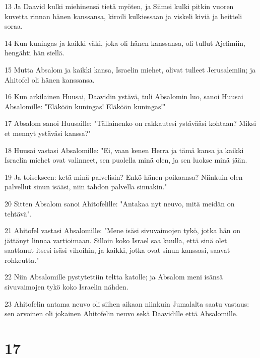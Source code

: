 \par 13 Ja Daavid kulki miehinensä tietä myöten, ja Siimei kulki pitkin vuoren kuvetta rinnan hänen kanssansa, kiroili kulkiessaan ja viskeli kiviä ja heitteli soraa.
\par 14 Kun kuningas ja kaikki väki, joka oli hänen kanssansa, oli tullut Ajefimiin, hengähti hän siellä.
\par 15 Mutta Absalom ja kaikki kansa, Israelin miehet, olivat tulleet Jerusalemiin; ja Ahitofel oli hänen kanssansa.
\par 16 Kun arkilainen Huusai, Daavidin ystävä, tuli Absalomin luo, sanoi Huusai Absalomille: "Eläköön kuningas! Eläköön kuningas!"
\par 17 Absalom sanoi Huusaille: "Tällainenko on rakkautesi ystävääsi kohtaan? Miksi et mennyt ystäväsi kanssa?"
\par 18 Huusai vastasi Absalomille: "Ei, vaan kenen Herra ja tämä kansa ja kaikki Israelin miehet ovat valinneet, sen puolella minä olen, ja sen luokse minä jään.
\par 19 Ja toisekseen: ketä minä palvelisin? Enkö hänen poikaansa? Niinkuin olen palvellut sinun isääsi, niin tahdon palvella sinuakin."
\par 20 Sitten Absalom sanoi Ahitofelille: "Antakaa nyt neuvo, mitä meidän on tehtävä".
\par 21 Ahitofel vastasi Absalomille: "Mene isäsi sivuvaimojen tykö, jotka hän on jättänyt linnaa vartioimaan. Silloin koko Israel saa kuulla, että sinä olet saattanut itsesi isäsi vihoihin, ja kaikki, jotka ovat sinun kanssasi, saavat rohkeutta."
\par 22 Niin Absalomille pystytettiin teltta katolle; ja Absalom meni isänsä sivuvaimojen tykö koko Israelin nähden.
\par 23 Ahitofelin antama neuvo oli siihen aikaan niinkuin Jumalalta saatu vastaus: sen arvoinen oli jokainen Ahitofelin neuvo sekä Daavidille että Absalomille.

\chapter{17}

